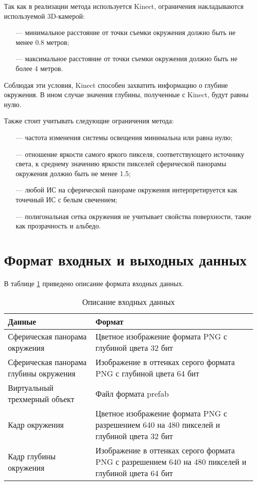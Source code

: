 Так как в реализации метода используется Kinect, ограничения накладываются используемой 3D-камерой:

\begin{itemize}
	\item[---] минимальное расстояние от точки съемки окружения должно быть не менее 0.8 метров;
	\item[---] максимальное расстояние от точки съемки окружения должно быть не более 4 метров.
\end{itemize}

Соблюдая эти условия, Kinect способен захватить информацию о глубине окружения. В ином случае значения глубины, полученные с Kinect, будут равны нулю.

Также стоит учитывать следующие ограничения метода:

\begin{itemize}
	\item[---] частота изменения системы освещения минимальна или равна нулю;
	\item[---] отношение яркости самого яркого пикселя, соответствующего источнику света, к среднему значению яркости пикселей сферической панорамы окружения должно быть не менее 1.5;
	\item[---] любой ИС на сферической панораме окружения интерпретируется как точечный ИС с белым свечением;
	\item[---] полигональная сетка окружения не учитывает свойства поверхности, такие как прозрачность и альбедо.
\end{itemize}

\section{Формат входных и выходных данных}

В таблице \ref{FormatData} приведено описание формата входных данных.

\begin{table}[H]
	\caption{Описание входных данных}
	\label{FormatData}
	\begin{center}
		\begin{tabular}{| p{6 cm} | p{9 cm} |} 
			\hline
			Данные & Формат \\
			\hline
			Сферическая панорама окружения & Цветное изображение формата PNG с глубиной цвета 32 бит \\
			\hline
			Сферическая панорама глубины окружения & Изображение в оттенках серого формата PNG с глубиной цвета 64 бит \\
			\hline
			Виртуальный трехмерный объект & Файл формата prefab \\
			\hline
			Кадр окружения & Цветное изображение формата PNG с разрешением 640 на 480 пикселей и глубиной цвета 32 бит \\
			\hline
			Кадр глубины окружения & Изображение в оттенках серого формата PNG с разрешением 640 на 480 пикселей и глубиной цвета 64 бит \\
			\hline
		\end{tabular}
	\end{center}
\end{table}


